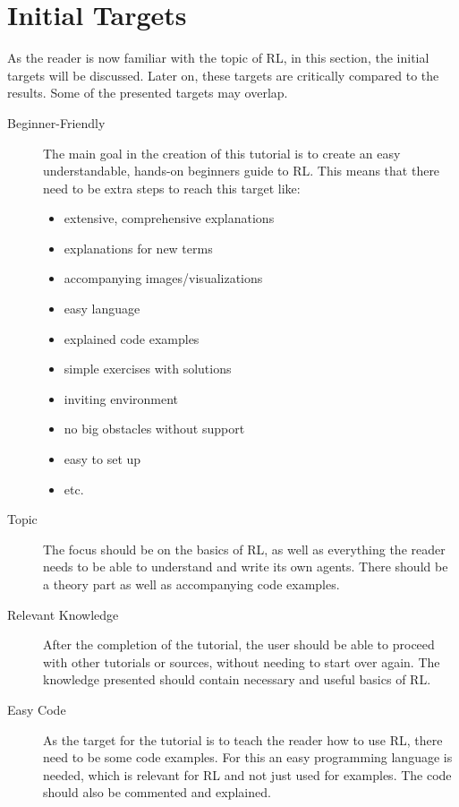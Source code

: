 \documentclass[10pt,a4paper]{article}
\begin{document}
	

	\section{Initial Targets}
		As the reader is now familiar with the topic of RL, in this section, the initial targets will be discussed. Later on, these targets are critically compared to the results. Some of the presented targets may overlap.
		
		\begin{description}
			\item[Beginner-Friendly] 	The main goal in the creation of this tutorial is to create an easy understandable, hands-on beginners guide to RL.
			This means that there need to be extra steps to reach this target like:
			\begin{itemize}
				\item extensive, comprehensive explanations
				\item explanations for new terms
				\item accompanying images/visualizations
				\item easy language
				\item explained code examples
				\item simple exercises with solutions
				\item inviting environment 
				\item no big obstacles without support
				\item easy to set up
				\item etc.
			\end{itemize}
			
			\item[Topic] The focus should be on the basics of RL, as well as everything the reader needs to be able to understand and write its own agents. There should be a theory part as well as accompanying code examples.
		
			\item[Relevant Knowledge] After the completion of the tutorial, the user should be able to proceed with other tutorials or sources, without needing to start over again. The knowledge presented should contain necessary and useful basics of RL.
			
			\item[Easy Code] As the target for the tutorial is to teach the reader how to use RL, there need to be some code examples. For this an easy programming language is needed, which is relevant for RL and not just used for examples. The code should also be commented and explained.\\ 
			

\end{description}
\end{document}
